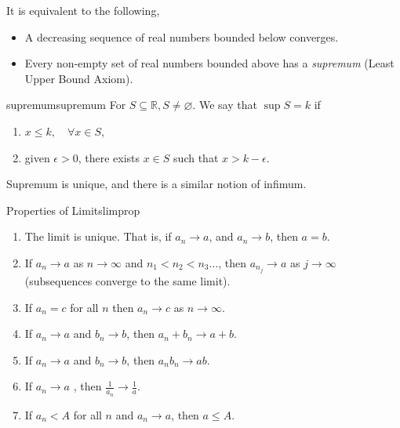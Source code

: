 \begin{remark}
    It is equivalent to the following,
    \begin{itemize}
        \item A decreasing sequence of real numbers bounded below converges.
        \item Every non-empty set of real numbers bounded above has a \textit{supremum} (Least Upper Bound Axiom).
    \end{itemize}
\end{remark}
\begin{definition}{supremum}{supremum}
    For \(S \subseteq \mathbb{R},S\neq \varnothing\). We say that \(\sup S = k\) if 
    \begin{enumerate}
        \item \(x \leq k, \quad \forall x \in S\),
        \item given \(\epsilon > 0\), there exists \(x \in S\) such that \(x > k - \epsilon\).
    \end{enumerate}
\end{definition}
\begin{note}
    Supremum is unique, and there is a similar notion of infimum.
\end{note}
\begin{lemma}{Properties of Limits}{limprop}
    \leavevmode
    \begin{enumerate}
        \item The limit is unique. That is, if \(a_n \to a\), and \(a_n \to b\), then \(a = b\).
        \item If \(a_n \to a\) as \(n \to \infty\) and \(n_1 < n_2 < n_3 \ldots \), then \(a_{n_j}\to a\) as \(j \to \infty\) (subsequences converge to the same limit).
        \item If \(a_n = c\) for all \(n\) then \(a_n \to c\) as \(n \to \infty\).
        \item If \(a_n \to a\) and \(b_n \to b\), then \(a_n + b_n \to  a+ b\).
        \item If \(a_n \to a\) and \(b_n \to b\), then \(a_n b_n \to  ab\).
        \item If \(a_n \to a\) , then \(\frac{1}{a_n} \to \frac{1}{a}\).
        \item If \(a_n < A\) for all \(n\) and \(a_n \to a\), then \(a \leq A\).
    \end{enumerate}
\end{lemma}
